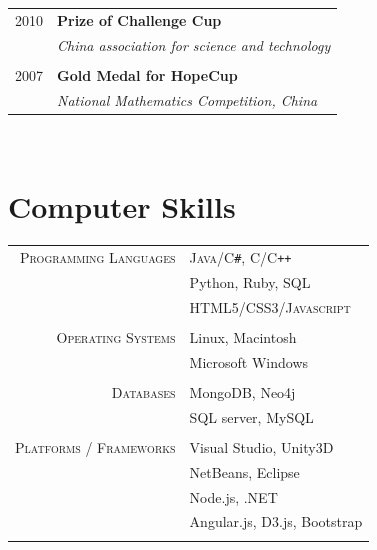 \documentclass[10pt]{article}
\begin{document}
{\begin{minipage}[t]{0.44\textwidth}
\begin{tabular}{rl}
2010	 & \textbf{\nth{2} Prize of \nth{7} Challenge Cup}\\
& \textit{China association for science and technology}\\ \\


2007	 & \textbf{Gold Medal for HopeCup}\\
& \textit{National Mathematics Competition, China}
\end{tabular}\\[10pt]


\section{Computer Skills} 

\begin{tabular}{r l}
\textsc{Programming Languages}
& \textsc{Java/C\texttt{\#}, C/C\texttt{++}}\\
& Python, Ruby, SQL\\
& \textsc{HTML5/CSS3/Javascript}\\ 
& \\
\textsc{Operating Systems}
& Linux, Macintosh\\
& Microsoft Windows \\
& \\
\textsc{Databases}
& MongoDB, Neo4j \\
& SQL server, MySQL \\
& \\
\textsc{Platforms / Frameworks}
& Visual Studio, Unity3D\\
& NetBeans, Eclipse \\
& Node.js, .NET\\
& Angular.js, D3.js, Bootstrap \\
& \\
\end{tabular}



\end{minipage}}
\end{document}
